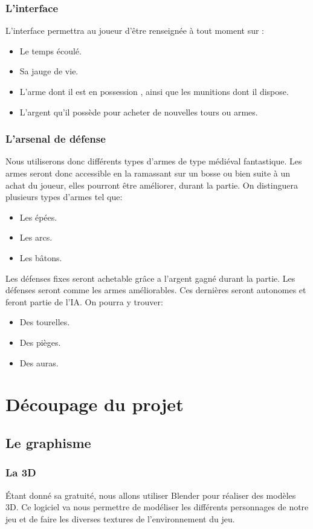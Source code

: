 \documentclass[a4paper, 12pt]{article}
\begin{document}
		\subsubsection{L'interface}
		L’interface permettra au joueur d'être renseignée à tout moment sur : 
		\begin{itemize}
		\item Le temps écoulé.
		\item Sa jauge de vie.
		\item L’arme dont il est en possession , ainsi que les  munitions dont il dispose.
		\item L’argent qu’il possède pour acheter de nouvelles tours ou armes.
		\end{itemize}
		\subsubsection{L'arsenal de défense}
		Nous utiliserons donc différents types d’armes de type médiéval fantastique.
Les armes seront donc accessible en la ramassant sur un bosse ou bien  suite à un achat du joueur, elles pourront être améliorer, durant la partie. On distinguera plusieurs types d’armes tel que:
	\begin{itemize}
	\item Les épées.
	\item Les arcs.
	\item Les bâtons.
	\end{itemize}
Les défenses fixes seront achetable grâce a l’argent gagné durant la partie. Les défenses seront comme les armes améliorables. Ces dernières seront autonomes et feront partie de l’IA. On pourra y trouver:
	\begin{itemize}
	\item Des tourelles.
	\item Des pièges.
	\item Des auras.
	\end{itemize}
\section{Découpage du projet}
	\subsection{Le graphisme}
		\subsubsection{La 3D}
		Étant donné sa gratuité, nous allons utiliser Blender pour réaliser des modèles 3D. Ce logiciel va nous permettre de modéliser les différents personnages de notre jeu et de faire les diverses textures de l’environnement du jeu.
\end{document}

